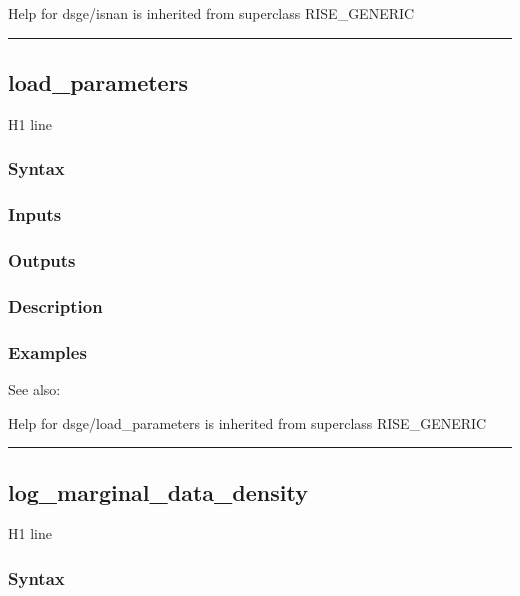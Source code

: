 \documentclass[letterpaper,10pt,english]{sphinxmanual}
\begin{document}
Help for dsge/isnan is inherited from superclass RISE\_GENERIC


\bigskip\hrule{}\bigskip



\subsection{load\_parameters}
\label{classes/models/@dsge/dsge:id78}\label{classes/models/@dsge/dsge:load-parameters}
H1 line


\subsubsection{Syntax}
\label{classes/models/@dsge/dsge:id79}

\subsubsection{Inputs}
\label{classes/models/@dsge/dsge:id80}

\subsubsection{Outputs}
\label{classes/models/@dsge/dsge:id81}

\subsubsection{Description}
\label{classes/models/@dsge/dsge:id82}

\subsubsection{Examples}
\label{classes/models/@dsge/dsge:id83}
See also:

Help for dsge/load\_parameters is inherited from superclass RISE\_GENERIC


\bigskip\hrule{}\bigskip



\subsection{log\_marginal\_data\_density}
\label{classes/models/@dsge/dsge:log-marginal-data-density}\label{classes/models/@dsge/dsge:id84}
H1 line


\subsubsection{Syntax}
\label{classes/models/@dsge/dsge:id85}
\end{document}
